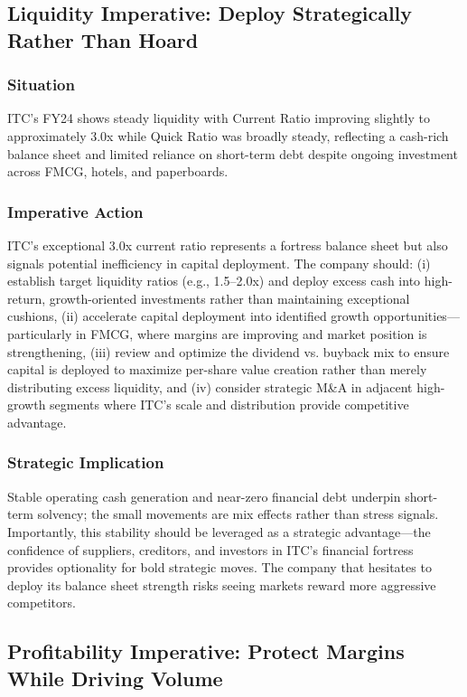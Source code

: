 \documentclass[12pt, a4paper]{report}
\begin{document}
\subsection{Liquidity Imperative: Deploy Strategically Rather Than Hoard}

\subsubsection{Situation}
ITC's FY24 shows steady liquidity with Current Ratio improving slightly to approximately 3.0x while Quick Ratio was broadly steady, reflecting a cash-rich balance sheet and limited reliance on short-term debt despite ongoing investment across FMCG, hotels, and paperboards.

\subsubsection{Imperative Action}
ITC's exceptional 3.0x current ratio represents a fortress balance sheet but also signals potential inefficiency in capital deployment. The company should: (i) establish target liquidity ratios (e.g., 1.5–2.0x) and deploy excess cash into high-return, growth-oriented investments rather than maintaining exceptional cushions, (ii) accelerate capital deployment into identified growth opportunities—particularly in FMCG, where margins are improving and market position is strengthening, (iii) review and optimize the dividend vs. buyback mix to ensure capital is deployed to maximize per-share value creation rather than merely distributing excess liquidity, and (iv) consider strategic M\&A in adjacent high-growth segments where ITC's scale and distribution provide competitive advantage.

\subsubsection{Strategic Implication}
Stable operating cash generation and near-zero financial debt underpin short-term solvency; the small movements are mix effects rather than stress signals. Importantly, this stability should be leveraged as a strategic advantage—the confidence of suppliers, creditors, and investors in ITC's financial fortress provides optionality for bold strategic moves. The company that hesitates to deploy its balance sheet strength risks seeing markets reward more aggressive competitors.

\subsection{Profitability Imperative: Protect Margins While Driving Volume}
\end{document}
